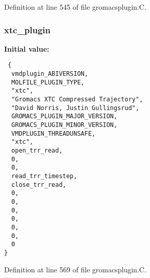 Definition at line 545 of file gromacsplugin.C.
\subsubsection{ xtc\_\-plugin\hspace{0.3cm}{\tt  [static]}}\label{gromacsplugin_8C_a6}


{\bf Initial value:}

\footnotesize\begin{verbatim} {
  vmdplugin_ABIVERSION,                
  MOLFILE_PLUGIN_TYPE,                 
  "xtc",                               
  "Gromacs XTC Compressed Trajectory", 
  "David Norris, Justin Gullingsrud",  
  GROMACS_PLUGIN_MAJOR_VERSION,        
  GROMACS_PLUGIN_MINOR_VERSION,        
  VMDPLUGIN_THREADUNSAFE,              
  "xtc",                               
  open_trr_read,
  0,
  0,
  read_trr_timestep,
  close_trr_read,
  0,                                  
  0,                                  
  0,                                  
  0,                                  
  0,                                  
  0,                                  
  0                                   
}\end{verbatim}\normalsize 


Definition at line 569 of file gromacsplugin.C.